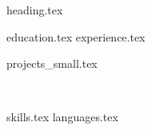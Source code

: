 \documentclass[letterpaper,11pt]{article}
\begin{document}
\pagestyle{empty}

{heading.tex}

{education.tex}
{experience.tex}
\begin{minipage}[t]{0.47\textwidth}
{projects_small.tex}
\end{minipage}\begin{minipage}[t]{0.06\textwidth}~\end{minipage}\begin{minipage}[t]{0.47\textwidth}
{skills.tex}
\vfill
{languages.tex}
\end{minipage}
\end{document}
